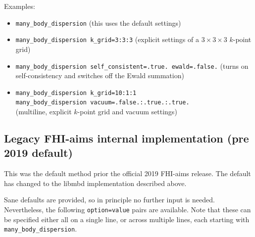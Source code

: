 Examples:
\begin{itemize}
    \item \verb+many_body_dispersion+ (this uses the default settings)
    \item \verb+many_body_dispersion k_grid=3:3:3+ (explicit settings of a $3\times3\times3$ $k$-point grid)
    \item \verb+many_body_dispersion self_consistent=.true. ewald=.false.+ (turns on self-consistency and switches off the Ewald summation)
    \item \verb+many_body_dispersion k_grid=10:1:1+\\
          \verb+many_body_dispersion vacuum=.false.:.true.:.true.+\\
          (multiline, explicit $k$-point grid and vacuum settings)
\end{itemize}


\subsection*{Legacy FHI-aims internal implementation (pre 2019 default)}

This was the default method prior the official 2019 FHI-aims release. 
The default has changed to the libmbd implementation  
described above.

Sane defaults are provided, so in principle no further input is
needed. Nevertheless, the following \texttt{option=value} pairs are
available. Note that these can be specified either all on a single line,
or across multiple lines, each starting with \texttt{many\_body\_dispersion}.
 
